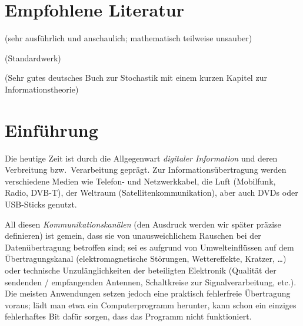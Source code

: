 \section*{Empfohlene Literatur}

 (sehr ausführlich und anschaulich; mathematisch teilweise unsauber)

 (Standardwerk)


 (Sehr gutes deutsches Buch zur Stochastik mit einem kurzen Kapitel zur Informationstheorie)


\section*{Einführung}
Die heutige Zeit ist durch die Allgegenwart \emph{digitaler Information} und deren Verbreitung bzw.\ Verarbeitung geprägt. Zur Informationsübertragung werden verschiedene Medien wie Telefon- und Netzwerkkabel, die Luft (Mobilfunk, Radio, DVB-T), der Weltraum (Satellitenkommunikation), aber auch DVDs oder USB-Sticks genutzt.

All diesen \emph{Kommunikationskanälen} (den Ausdruck werden wir später präzise definieren) ist gemein, dass sie von unausweichlichem Rauschen bei der Datenübertragung betroffen sind; sei es aufgrund von Umwelteinflüssen auf dem Übertragungskanal (elektromagnetische Störungen, Wettereffekte, Kratzer, \dots) oder technische Unzulänglichkeiten der beteiligten Elektronik (Qualität der sendenden / empfangenden Antennen, Schaltkreise zur Signalverarbeitung, etc.). Die meisten Anwendungen setzen jedoch eine praktisch fehlerfreie Übertragung voraus; lädt man etwa ein Computerprogramm herunter, kann schon ein einziges fehlerhaftes Bit dafür sorgen, dass das Programm nicht funktioniert.

